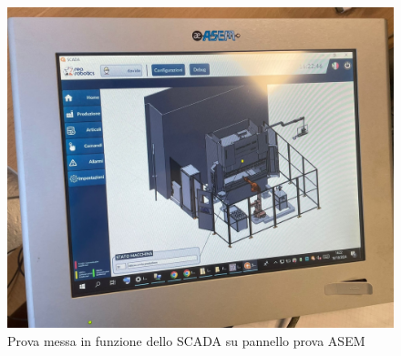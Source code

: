 \begin{figure} [ht]
    \centering
    \includegraphics[width=0.7\linewidth]{Immagini/PannelloASEM.jpg}
    \caption{Prova messa in funzione dello SCADA su pannello prova ASEM}
    \label{fig:PannelloASEM.jpg}
\end{figure}